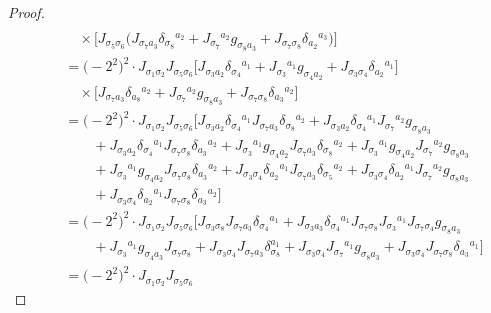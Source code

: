 \documentclass[pdftex]{sigma}
\numberwithin{equation}{section}
\theoremstyle{definition}
\begin{document}
\begin{proof}
\begin{gather}
 \nonumber\\
 \qquad\quad{} \times
\bigl[J_{\sigma_5 \sigma_6} \bigl(J_{\sigma_7 a_3} \delta_{\sigma_8}{}^{a_2}
+ J_{\sigma_7}{}^{a_2} g_{\sigma_8 a_3}
+ J_{\sigma_7 \sigma_8} \delta_{a_2}{}^{a_3} \bigr)\bigr]
 \nonumber\\
\qquad{}=
\bigl(-2^2\bigr)^2\cdot J_{\sigma_1 \sigma_2} J_{\sigma_5 \sigma_6}
\bigl[J_{\sigma_3 a_2} \delta_{\sigma_4}{}^{a_1}
+J_{\sigma_3}{}^{a_1} g_{\sigma_4 a_2}
+J_{\sigma_3 \sigma_4} \delta_{a_2}{}^{a_1} \bigr]\nonumber\\
\quad\qquad{} \times
\bigl[J_{\sigma_7 a_3} \delta_{a_8}{}^{a_2}
+J_{\sigma_7}{}^{a_2} g_{\sigma_8 a_3}
+J_{\sigma_7 \sigma_8} \delta_{a_3}{}^{a_2} \bigr]
 \nonumber\\
\qquad{}=
\bigl(-2^2\bigr)^2\cdot
J_{\sigma_1 \sigma_2} J_{\sigma_5 \sigma_6}
\bigl[ J_{\sigma_3 a_2} \delta_{\sigma_4}{}^{a_1} J_{\sigma_7 a_3}
\delta_{\sigma_8}{}^{a_2}
+J_{\sigma_3 a_2}\delta_{\sigma_4}{}^{a_1} J_{\sigma_7}{}^{a_2}
g_{\sigma_8 a_3} \nonumber
\\
\qquad\qquad{} +J_{\sigma_3 a_2} \delta_{\sigma_4}{}^{a_1} J_{\sigma_7 \sigma_8}
\delta_{a_3}{}^{a_2}
+J_{\sigma_3}{}^{a_1} g_{\sigma_4 a_2} J_{\sigma_7 a_3}
\delta_{\sigma_8}{}^{a_2}
+J_{\sigma_3}{}^{a_1} g_{\sigma_4 a_2} J_{\sigma_7}{}^{a_2}
g_{\sigma_8 a_3} \nonumber \\
 \qquad\qquad{} +J_{\sigma_3}{}^{a_1} g_{\sigma_4 a_2} J_{\sigma_7 \sigma_8}
\delta_{a_3}{}^{a_2}
+J_{\sigma_3 \sigma_4} \delta_{a_2}{}^{a_1} J_{\sigma_7 a_3}
\delta_{\sigma_5}{}^{a_2}
+J_{\sigma_3 \sigma_4} \delta_{a_2}{}^{a_1} J_{\sigma_7}{}^{a_2}
g_{\sigma_8 a_3} \nonumber\\
\qquad\qquad{} +J_{\sigma_3 \sigma_4} \delta_{a_2}{}^{a_1} J_{\sigma_7 \sigma_8}
\delta_{a_3}{}^{a_2} \bigr]\nonumber\\
\qquad{} =
\bigl(-2^2\bigr)^2\cdot J_{\sigma_1 \sigma_2} J_{\sigma_5 \sigma_6}
\bigl[J_{\sigma_3 \sigma_8} J_{\sigma_7 a_3} \delta_{\sigma_4}{}^{a_1}
+J_{\sigma_3 a_3} \delta_{\sigma_4}{}^{a_1} J_{\sigma_7 \sigma_8}
J_{\sigma_3}{}^{a_1} J_{\sigma_7 \sigma_4} g_{\sigma_8 a_3}
 \nonumber\\
 \qquad\qquad{} +J_{\sigma_3}{}^{a_1} g_{\sigma_4 a_3} J_{\sigma_7 \sigma_8}
+J_{\sigma_3 \sigma_4} J_{\sigma_7 a_3} \delta_{\sigma_8}^{a_1}
+J_{\sigma_3 \sigma_4} J_{\sigma_7}{}^{a_1} g_{\sigma_8 a_3}
+J_{\sigma_3 \sigma_4} J_{\sigma_7 \sigma_8} \delta_{a_3}{}^{a_1}\bigr]
 \nonumber\\
\qquad{} =
\bigl(-2^2\bigr)^2\cdot J_{\sigma_1 \sigma_2} J_{\sigma_5 \sigma_6}

\end{gather}
\end{proof}
\end{document}
